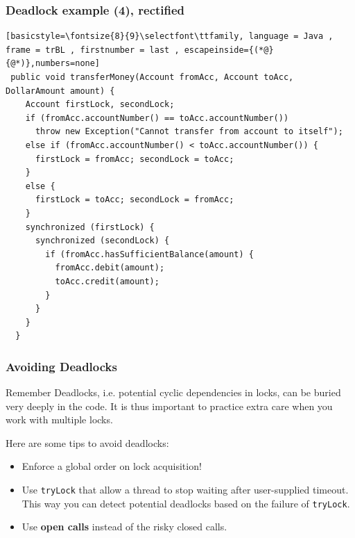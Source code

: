 \documentclass[xcolor={dvipsnames,svgnames},aspectratio=169]{beamer}
\begin{document}
\begin{frame}[fragile]
  \frametitle{\faSkull \quad Deadlock example (4), rectified}

\begin{lstlisting}[basicstyle=\fontsize{8}{9}\selectfont\ttfamily, language = Java ,
frame = trBL , firstnumber = last , escapeinside={(*@}{@*)},numbers=none]
 public void transferMoney(Account fromAcc, Account toAcc, DollarAmount amount) {
    Account firstLock, secondLock;
    if (fromAcc.accountNumber() == toAcc.accountNumber())
      throw new Exception("Cannot transfer from account to itself");
    else if (fromAcc.accountNumber() < toAcc.accountNumber()) {
      firstLock = fromAcc; secondLock = toAcc;
    }
    else {
      firstLock = toAcc; secondLock = fromAcc;
    }
    synchronized (firstLock) {
      synchronized (secondLock) {
        if (fromAcc.hasSufficientBalance(amount) {
          fromAcc.debit(amount);
          toAcc.credit(amount);
        }
      }
    }
  }
\end{lstlisting}
\end{frame}

\begin{frame}[fragile]
  \frametitle{\faBriefcaseMedical \quad Avoiding Deadlocks}

  \begin{block}{\faExclamationTriangle \quad Remember}
    Deadlocks, i.e. potential cyclic dependencies in locks, can be buried very
    deeply in the code. It is thus important to practice extra care when you
    work with multiple locks.
  \end{block}

  Here are some tips to avoid deadlocks:

  \begin{itemize}
  \item[\faBook]<2-> Enforce a global order on lock acquisition!
  \item[\faBook]<3-> Use \texttt{tryLock} that allow a thread to stop waiting
    after user-supplied timeout. This way you can detect potential deadlocks
    based on the failure of \texttt{tryLock}.
  \item[\faBook]<4-> Use \textbf{open calls} instead of the risky closed calls.
  \end{itemize}

\end{frame}
\end{document}
